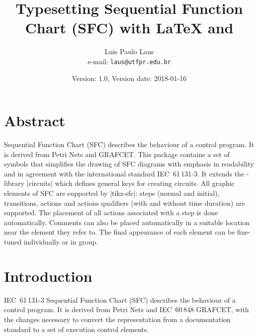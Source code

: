 \documentclass[a4paper]{ltxdoc}
\begin{document}
\title{Typesetting Sequential Function Chart (SFC) with \LaTeX{} and \tikzname{}}
\author{Luis Paulo Laus\\e-mail: \texttt{laus@utfpr.edu.br}}
\date{Version: 1.0, Version date: 2018-01-16}

\maketitle

\section{Abstract}
Sequential Function Chart (SFC) describes the behaviour of a control program. It is derived from Petri Nets and GRAFCET. This package contains a set of symbols that simplifies the drawing of SFC diagrams with emphasis in readability and in agreement with the international standard IEC~61\,131-3. It extends the \tikzname-library |circuits| which defines general keys for creating circuits. All graphic elements of SFC are supported by |tikz-sfc|: steps (normal and initial), transitions, actions and actions qualifiers (with and without time duration) are supported. The placement of all actions associated with a step is done automatically. Comments can also be placed automatically in a suitable location near the element they refer to. The final appearance of each element can be fine-tuned individually or in group.

\section{Introduction\label{sec:introduction}}
IEC~61\,131-3 Sequential Function Chart (SFC) describes the behaviour of a control program. It is derived from Petri Nets and IEC~60\,848 GRAFCET, with the changes necessary to convert the representation from a documentation standard to a set of execution control elements.
\end{document}
